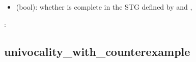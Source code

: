\documentclass[letterpaper,10pt,english]{sphinxmanual}
\begin{document}
\begin{fulllineitems}
\begin{description}
\begin{itemize}
\end{itemize}

\item[{\sphinxstylestrong{returns}:}] \leavevmode\begin{itemize}
\item {} 
 (bool): whether  is complete in the STG defined by  and ,

\end{itemize}

\end{description}

:

\begin{sphinxVerbatim}[commandchars=\\\{\}]
 
\end{sphinxVerbatim}

\end{fulllineitems}



\subsection{univocality\_with\_counterexample}
\label{\detokenize{AttractorDetection:id7}}\label{\detokenize{AttractorDetection:univocality-with-counterexample}}
\end{document}
